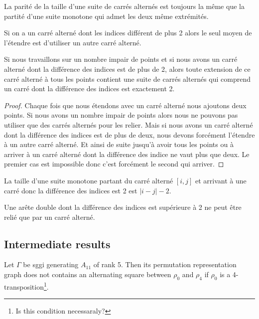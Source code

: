 \begin{lemma}
  La parité de la taille d'une suite de carrés alternés est toujours la même que la partité d'une suite monotone qui admet les deux même extrémités.
\end{lemma}

\begin{lemma}
  \label{lemma-continue-alternating-square}
  Si on a un carré alterné dont les indices différent de plus 2 alors le seul moyen de l'étendre est d'utiliser un autre carré alterné.
\end{lemma}

\begin{corollary}
  Si nous travaillons sur un nombre impair de points et si nous avons un carré alterné dont la différence des indices est de plus de 2, alors toute extension de ce carré alterné à tous les points contient une suite de carrés alternés qui comprend un carré dont la différence des indices est exactement 2.
\end{corollary}

\begin{proof}
  Chaque fois que nous étendons avec un carré alterné nous ajoutons deux points. Si nous avons un nombre impair de points alors nous ne pouvons pas utiliser que des carrés alternés pour les relier. Mais si nous avons un carré alterné dont la différence des indices est de plus de deux, nous devons forcément l'étendre à un autre carré alterné. Et ainsi de suite jusqu'à avoir tous les points ou à arriver à un carré alterné dont la différence des indice ne vaut plus que deux. Le premier cas est impossible donc c'est forcément le second qui arriver.
\end{proof}

\begin{lemma}
  La taille d'une suite monotone partant du carré alterné $[i, j]$ et arrivant à une carré donc la différence des indices est 2 est $|i - j| - 2$.
\end{lemma}

\begin{lemma}
  Une arête double dont la différence des indices est supérieure à 2 ne peut être relié que par un carré alterné.
\end{lemma}

\subsection{Intermediate results}

\begin{lemma}
  \label{lemma-forbidden-alternating-square}
  Let $\Gamma$ be sggi generating $A_{11}$ of rank 5. Then its permutation representation graph does not contains an alternating square between $\rho_0$ and $\rho_4$ if $\rho_0$ is a 4-transposition\footnote{Is this condition necessaraly?}.
\end{lemma}

